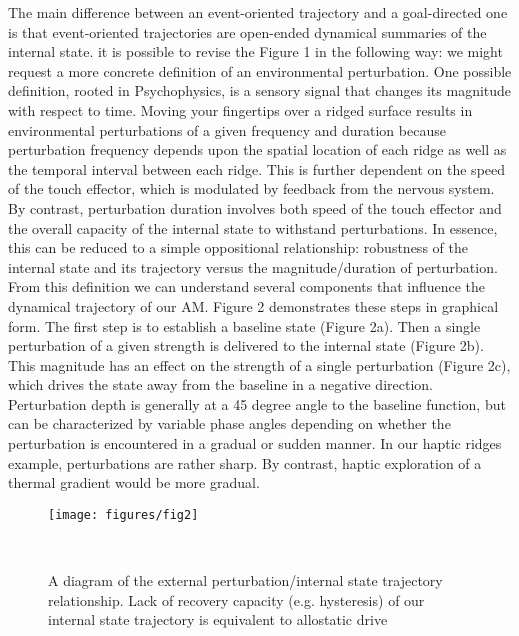 \documentclass{sigchi}
\begin{document}
The main difference between an event-oriented trajectory and a goal-directed one is that event-oriented trajectories are open-ended \cite{adam} dynamical summaries of the internal state. it is possible to revise the Figure 1 in the following way: we might request a more concrete definition of an environmental perturbation. One possible definition, rooted in Psychophysics, is a sensory signal that changes its magnitude with respect to time. Moving your fingertips over a ridged surface results in environmental perturbations of a given frequency and duration because perturbation frequency depends upon the spatial location of each ridge as well as the temporal interval between each ridge. This is further dependent on the speed of the touch effector, which is modulated by feedback from the nervous system. By contrast, perturbation duration involves both speed of the touch effector and the overall capacity of the internal state to withstand perturbations. In essence, this can be reduced to a simple oppositional relationship: robustness of the internal state and its trajectory versus the magnitude/duration of perturbation. \\
From this definition we can understand several components that influence the dynamical trajectory of our AM. Figure 2 demonstrates these steps in graphical form. The first step is to establish a baseline state (Figure 2a). Then a single perturbation of a given strength is delivered to the internal state (Figure 2b). This magnitude has an effect on the strength of a single perturbation (Figure 2c), which drives the state away from the baseline in a negative direction. Perturbation depth is generally at a 45 degree angle to the baseline function, but can be characterized by variable phase angles depending on whether the perturbation is encountered in a gradual or sudden manner. In our haptic ridges example, perturbations are rather sharp. By contrast, haptic exploration of a thermal gradient would be more gradual. \\
\begin{figure}[h]
\centering
  \texttt{[image: figures/fig2]}
  \caption{A diagram of the external perturbation/internal state trajectory relationship. Lack of recovery capacity (e.g. hysteresis) of our internal state trajectory is equivalent to allostatic drive}~\label{fig:figure2}
\end{figure}
\end{document}
